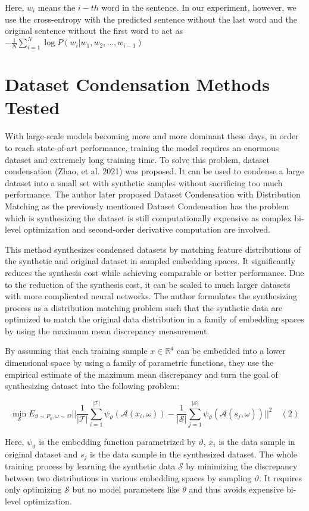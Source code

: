 \documentclass{article}
\begin{document}
Here, $w_{i}$ means the $i-th$ word in the sentence. In our experiment, however, we use the cross-entropy with the predicted sentence without the last word and the original sentence without the first word to act as  $-\frac{1}{N} \sum_{i=1}^{N} \log P(w_i|w_1, w_2, \ldots, w_{i-1})$


\section{Dataset Condensation Methods Tested}
With large-scale models becoming more and more dominant these days, in order to reach state-of-art performance, training the model requires an enormous dataset and extremely long training time. To solve this problem, dataset condensation (Zhao, et al. 2021) was proposed. It can be used to condense a large dataset into a small set with synthetic samples without sacrificing too much performance. The author later proposed Dataset Condensation with Distribution Matching as the previously mentioned Dataset Condensation has the problem which is synthesizing the dataset is still computationally expensive as complex bi-level optimization and second-order derivative computation are involved. 

This method synthesizes condensed datasets by matching feature distributions of the synthetic and original dataset in sampled embedding spaces. It significantly reduces the synthesis cost while achieving comparable or better performance. Due to the reduction of the synthesis cost, it can be scaled to much larger datasets with more complicated neural networks. The author formulates the synthesizing process as a distribution matching problem such that the synthetic data are optimized to match the original data distribution in a family of embedding spaces by using the maximum mean discrepancy measurement.

By assuming that each training sample $x\in \mathbb{R}^d$ can be embedded into a lower dimensional space by using a family of parametric functions, they use the empirical estimate of the maximum mean discrepancy and turn the goal of synthesizing dataset into the following problem:

$$\min_{\mathcal{S}}E_{\vartheta\sim P_{\vartheta},\omega\sim\Omega}||\frac{1}{|\mathcal{T}|}\sum^{|\mathcal{T}|}_{i=1}\psi_{\vartheta}(\mathcal{A}(x_i,\omega))- \frac{1}{|\mathcal{S}|}\sum^{|\mathcal{S}|}_{j=1}\psi_{\vartheta}(\mathcal{A}(s_j,\omega))     ||^2 \quad (2)$$

Here, $\psi_{\vartheta}$ is the embedding function parametrized by $\vartheta$, $x_i$ is the data sample in original dataset and $s_j$ is the data sample in the synthesized dataset. The whole training process by learning the synthetic data $\mathcal{S}$ by minimizing the discrepancy between two distributions in various embedding spaces by sampling $\vartheta$. It requires only optimizing $\mathcal{S}$ but no model parameters like $\theta$ and thus avoids expensive bi-level optimization. 
\end{document}
